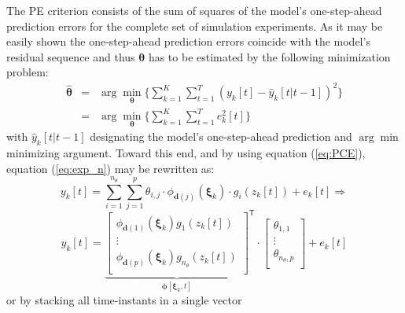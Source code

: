 \documentclass[12pt,a4paper,twocolumn,fleqn]{narms}
\newcommand{\bld}[1]{\boldsymbol{#1}}
\newcommand{\bth}{\bld{\theta}}
\newcommand{\bphi}{\bld{\phi}}
\newcommand{\bxi}{\bld{\xi}}
\newcommand{\beq}{\begin{equation}}
\newcommand{\eeq}{\end{equation}}
\begin{document}
The PE criterion consists of the sum of squares of the model's one-step-ahead prediction errors for the complete set of simulation experiments. As it may be easily shown the one-step-ahead prediction errors coincide with the model's residual sequence and thus $\bth$ has to be estimated by the following minimization problem:
\begin{eqnarray} 
\widehat{\bth} & = & \arg\min_{\bth} \biggl\{ \sum_{k=1}^K \sum_{t=1}^T  (y_k[t] - \hat{y}_k[t|t-1])^2 \biggr\} \nonumber\\ 
& = & \arg\min_{\bth} \biggl\{ \sum_{k=1}^K \sum_{t=1}^T  e_k^2[t] \biggr\} \label{eq:PEcrit} 
\end{eqnarray}
with $ \hat{y}_k[t|t-1]$ designating the model's one-step-ahead prediction and $\arg\min$ minimizing argument. Toward this end, and by using equation (\ref{eq:PCE}), equation (\ref{eq:exp_n}) may be rewritten as:
$$ y_k[t]  =  \sum_{i=1}^{n_\theta}\sum_{j=1}^{p}  \theta_{i,j} \cdot \phi_{\bld{d}(j)}(\bxi_k) \cdot g_i(z_k[t]) + e_k[t] \Rightarrow $$
\beq y_k[t]  = {\underbrace{\left[\begin{array}{c}
\phi_{\bld{d}(1)}(\bxi_k) g_1(z_k[t]) \\
\vdots\\
\phi_{\bld{d}(p)}(\bxi_k) g_{n_\theta}(z_k[t]) \\
\end{array}\right]}_{\bphi [\bxi_k,t]}}^{\mathsf{T}}   \!\! \cdot \!\!  \left[\!\!\!  \begin{array}{c}
\theta_{1,1} \\
\vdots\\
\theta_{n_\theta,p} \\
\end{array} \!\!\! \right]\!\! +  e_k[t]
\eeq
or by stacking all time-instants in a single vector
\end{document}
